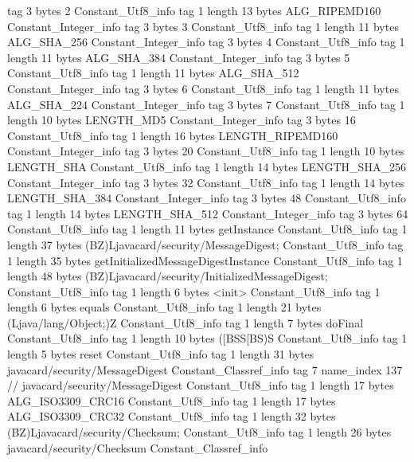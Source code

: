 {{{			tag	3
			bytes	2
		}
		Constant_Utf8_info {
			tag	1
			length	13
			bytes	ALG_RIPEMD160
		}
		Constant_Integer_info {
			tag	3
			bytes	3
		}
		Constant_Utf8_info {
			tag	1
			length	11
			bytes	ALG_SHA_256
		}
		Constant_Integer_info {
			tag	3
			bytes	4
		}
		Constant_Utf8_info {
			tag	1
			length	11
			bytes	ALG_SHA_384
		}
		Constant_Integer_info {
			tag	3
			bytes	5
		}
		Constant_Utf8_info {
			tag	1
			length	11
			bytes	ALG_SHA_512
		}
		Constant_Integer_info {
			tag	3
			bytes	6
		}
		Constant_Utf8_info {
			tag	1
			length	11
			bytes	ALG_SHA_224
		}
		Constant_Integer_info {
			tag	3
			bytes	7
		}
		Constant_Utf8_info {
			tag	1
			length	10
			bytes	LENGTH_MD5
		}
		Constant_Integer_info {
			tag	3
			bytes	16
		}
		Constant_Utf8_info {
			tag	1
			length	16
			bytes	LENGTH_RIPEMD160
		}
		Constant_Integer_info {
			tag	3
			bytes	20
		}
		Constant_Utf8_info {
			tag	1
			length	10
			bytes	LENGTH_SHA
		}
		Constant_Utf8_info {
			tag	1
			length	14
			bytes	LENGTH_SHA_256
		}
		Constant_Integer_info {
			tag	3
			bytes	32
		}
		Constant_Utf8_info {
			tag	1
			length	14
			bytes	LENGTH_SHA_384
		}
		Constant_Integer_info {
			tag	3
			bytes	48
		}
		Constant_Utf8_info {
			tag	1
			length	14
			bytes	LENGTH_SHA_512
		}
		Constant_Integer_info {
			tag	3
			bytes	64
		}
		Constant_Utf8_info {
			tag	1
			length	11
			bytes	getInstance
		}
		Constant_Utf8_info {
			tag	1
			length	37
			bytes	(BZ)Ljavacard/security/MessageDigest;
		}
		Constant_Utf8_info {
			tag	1
			length	35
			bytes	getInitializedMessageDigestInstance
		}
		Constant_Utf8_info {
			tag	1
			length	48
			bytes	(BZ)Ljavacard/security/InitializedMessageDigest;
		}
		Constant_Utf8_info {
			tag	1
			length	6
			bytes	<init>
		}
		Constant_Utf8_info {
			tag	1
			length	6
			bytes	equals
		}
		Constant_Utf8_info {
			tag	1
			length	21
			bytes	(Ljava/lang/Object;)Z
		}
		Constant_Utf8_info {
			tag	1
			length	7
			bytes	doFinal
		}
		Constant_Utf8_info {
			tag	1
			length	10
			bytes	([BSS[BS)S
		}
		Constant_Utf8_info {
			tag	1
			length	5
			bytes	reset
		}
		Constant_Utf8_info {
			tag	1
			length	31
			bytes	javacard/security/MessageDigest
		}
		Constant_Classref_info {
			tag	7
			name_index	137		// javacard/security/MessageDigest
		}
		Constant_Utf8_info {
			tag	1
			length	17
			bytes	ALG_ISO3309_CRC16
		}
		Constant_Utf8_info {
			tag	1
			length	17
			bytes	ALG_ISO3309_CRC32
		}
		Constant_Utf8_info {
			tag	1
			length	32
			bytes	(BZ)Ljavacard/security/Checksum;
		}
		Constant_Utf8_info {
			tag	1
			length	26
			bytes	javacard/security/Checksum
		}
		Constant_Classref_info {
}}}
